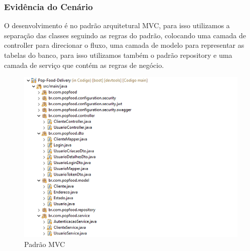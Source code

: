 \subsubsection{Evidência do Cenário \avcen} 

O desenvolvimento é no padrão arquitetural MVC, para isso utilizamos a separação das classes seguindo as regras do padrão, colocando
uma camada de controller para direcionar o fluxo, uma camada de modelo para representar as tabelas do banco, para isso utilizamos também o 
padrão repository e uma camada de serviço que contém as regras de negócio.

\begin{figure}[h]
   \centering
   \includegraphics[width=1\textwidth]{padrao_mvc.png}
   \caption{Padrão MVC}
   \label{fig:Padrao MVC}
\end{figure}

\pgfmathtruncatemacro{}
